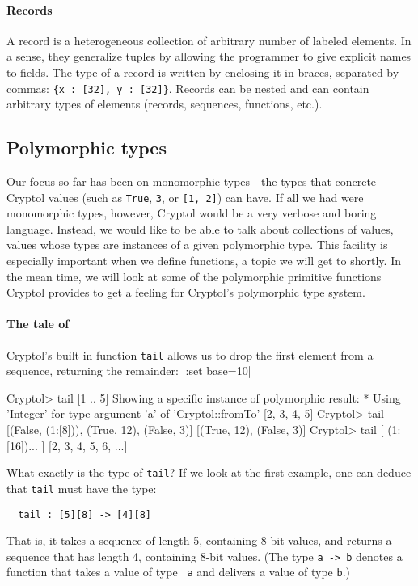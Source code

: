 \paragraph{Records}\indTheRecordType
A record is a heterogeneous collection of arbitrary number of labeled
elements.  In a sense, they generalize tuples by allowing the
programmer to give explicit names to fields. The type of a record is
written by enclosing it in braces, separated by commas:
\texttt{\{x :\ [32], y :\ [32]\}}. Records can be nested and can contain arbitrary
types of elements (records, sequences, functions, etc.).

\subsection{Polymorphic types}\indPolymorphism
\label{sec:polymorphic-types}

Our focus so far has been on monomorphic types---the types that
concrete Cryptol values (such as {\tt True}, {\tt 3}, or {\tt [1, 2]})
can have.  If all we had were monomorphic types, however, Cryptol
would be a very verbose and boring language.  Instead, we would like
to be able to talk about collections of values, values whose types are
instances of a given polymorphic type. This facility is especially
important when we define functions, a topic we will get to shortly. In
the mean time, we will look at some of the polymorphic primitive
functions Cryptol provides to get a feeling for Cryptol's polymorphic
type system.

\paragraph{The tale of {}}\indTail
Cryptol's built in function {\tt tail} allows us to drop the first
element from a sequence, returning the remainder:
\restartrepl
\hidereplin|:set base=10|
\begin{replPrompt}
  Cryptol> tail [1 .. 5]
  Showing a specific instance of polymorphic result:
    * Using 'Integer' for type argument 'a' of 'Cryptol::fromTo'
  [2, 3, 4, 5]
  Cryptol> tail [(False, (1:[8])), (True, 12), (False, 3)]
  [(True, 12), (False, 3)]
  Cryptol> tail [ (1:[16])... ]
  [2, 3, 4, 5, 6, ...]
\end{replPrompt}
What exactly is the type of {\tt tail}? If we look at the first
example, one can deduce that {\tt tail} must have the type:
\begin{Verbatim}
  tail : [5][8] -> [4][8]
\end{Verbatim}
That is, it takes a sequence of length 5, containing 8-bit values, and
returns a sequence that has length 4, containing 8-bit values. (The
type {\tt a -> b} denotes a function that takes a value of type {\tt
  a} and delivers a value of type {\tt b}.)

